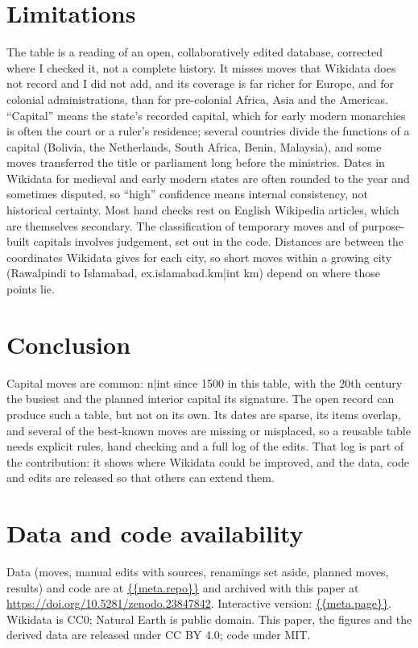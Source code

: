 \documentclass[11pt,a4paper]{article}
\begin{document}
\section{Limitations}
The table is a reading of an open, collaboratively edited database, corrected where I checked it, not a complete history. It misses moves that Wikidata does not record and I did not add, and its coverage is far richer for Europe, and for colonial administrations, than for pre-colonial Africa, Asia and the Americas. ``Capital'' means the state's recorded capital, which for early modern monarchies is often the court or a ruler's residence; several countries divide the functions of a capital (Bolivia, the Netherlands, South Africa, Benin, Malaysia), and some moves transferred the title or parliament long before the ministries. Dates in Wikidata for medieval and early modern states are often rounded to the year and sometimes disputed, so ``high'' confidence means internal consistency, not historical certainty. Most hand checks rest on English Wikipedia articles, which are themselves secondary. The classification of temporary moves and of purpose-built capitals involves judgement, set out in the code. Distances are between the coordinates Wikidata gives for each city, so short moves within a growing city (Rawalpindi to Islamabad, {{ex.islamabad.km|int}} km) depend on where those points lie.

\section{Conclusion}
Capital moves are common: {{n|int}} since 1500 in this table, with the 20th century the busiest and the planned interior capital its signature. The open record can produce such a table, but not on its own. Its dates are sparse, its items overlap, and several of the best-known moves are missing or misplaced, so a reusable table needs explicit rules, hand checking and a full log of the edits. That log is part of the contribution: it shows where Wikidata could be improved, and the data, code and edits are released so that others can extend them.

\section*{Data and code availability}
Data (moves, manual edits with sources, renamings set aside, planned moves, results) and code are at \url{{{meta.repo}}} and archived with this paper at \href{https://doi.org/10.5281/zenodo.23847842}{https://doi.org/10.5281/zenodo.23847842}. Interactive version: \url{{{meta.page}}}. Wikidata is CC0; Natural Earth is public domain. This paper, the figures and the derived data are released under CC BY 4.0; code under MIT.
\end{document}
